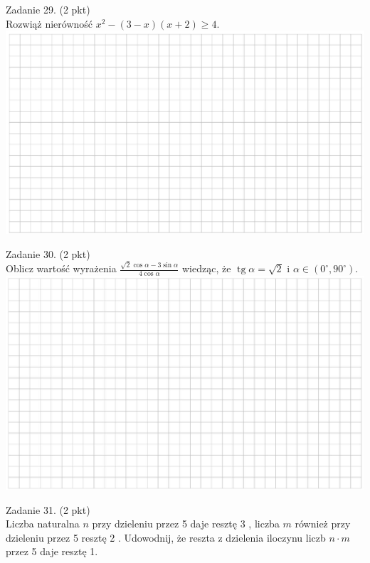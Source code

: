 \documentclass[10pt]{article}
\begin{document}
Zadanie 29. (2 pkt)\\
Rozwiąż nierówność \(x^{2}-(3-x)(x+2) \geq 4\).\\
\includegraphics[max width=\textwidth, center]{2024_11_21_8e981e1ab2c7e641f462g-11(1)}

Zadanie 30. (2 pkt)\\
Oblicz wartość wyrażenia \(\frac{\sqrt{2} \cos \alpha-3 \sin \alpha}{4 \cos \alpha}\) wiedząc, że \(\operatorname{tg} \alpha=\sqrt{2}\) i \(\alpha \in\left(0^{\circ}, 90^{\circ}\right)\).\\
\includegraphics[max width=\textwidth, center]{2024_11_21_8e981e1ab2c7e641f462g-12}

Zadanie 31. (2 pkt)\\
Liczba naturalna \(n\) przy dzieleniu przez 5 daje resztę 3 , liczba \(m\) również przy dzieleniu przez 5 resztę 2 . Udowodnij, że reszta z dzielenia iloczynu liczb \(n \cdot m\) przez 5 daje resztę 1.\\
\(\qquad\)
\end{document}
